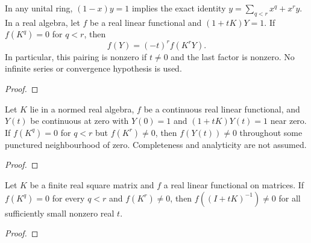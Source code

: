 \begin{supporting}
\begin{theorem}
\label{thm:inverse-path-factorization}
\leanok
In any unital ring, $(1-x)y=1$ implies the exact identity
$y=\sum_{q<r}x^q+x^ry$.
In a real algebra, let $f$ be a real linear functional and $(1+tK)Y=1$.
If $f(K^q)=0$ for $q<r$, then
\[
 f(Y)=(-t)^r f(K^rY).
\]
In particular, this pairing is nonzero if $t\ne0$ and the last factor is nonzero.
No infinite series or convergence hypothesis is used.
\end{theorem}
\begin{proof}
\leanok
\end{proof}

\begin{theorem}
\label{thm:inverse-path-nonvanishing}
\leanok
Let $K$ lie in a normed real algebra, $f$ be a continuous real linear functional,
and $Y(t)$ be continuous at zero with $Y(0)=1$ and $(1+tK)Y(t)=1$ near zero.
If $f(K^q)=0$ for $q<r$ but $f(K^r)\ne0$, then $f(Y(t))\ne0$ throughout
some punctured neighbourhood of zero. Completeness and analyticity are not assumed.
\end{theorem}
\begin{proof}
\leanok
\end{proof}

\begin{theorem}
\label{thm:finite-inverse-path}
\leanok
Let $K$ be a finite real square matrix and $f$ a real linear functional on
matrices. If $f(K^q)=0$ for every $q<r$ and $f(K^r)\ne0$, then
$f((I+tK)^{-1})\ne0$ for all sufficiently small nonzero real $t$.
\end{theorem}
\begin{proof}
\leanok
\end{proof}


\end{supporting}
